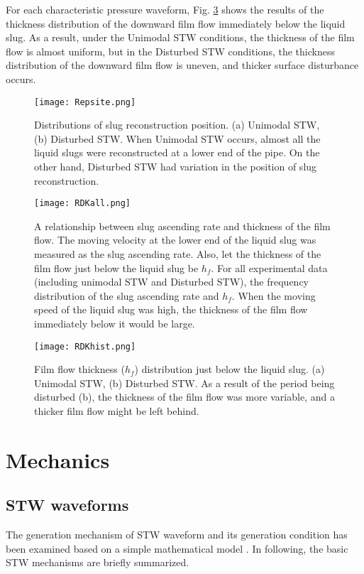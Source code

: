 \documentclass[aps,pre,preprint,groupedaddress,showkeys]{revtex4-2}
\begin{document}
For each characteristic pressure waveform, Fig. \ref{RDKhist} shows the results of the thickness distribution of the downward film flow immediately below the liquid slug.
As a result, under the Unimodal STW conditions, the thickness of the film flow is almost uniform, but in the Disturbed STW conditions, the thickness distribution of the downward film flow is uneven, and thicker surface disturbance occurs.

\begin{figure}
\texttt{[image: Repsite.png]} 
\caption{\label{Repsite}Distributions of slug reconstruction position. (a) Unimodal STW, (b) Disturbed STW. When Unimodal STW occurs, almost all the liquid slugs were reconstructed at a lower end of the pipe.
On the other hand, Disturbed STW had variation in the position of slug reconstruction.}
\end{figure} 

\begin{figure}
\texttt{[image: RDKall.png]} 
\caption{\label{RDKall}A relationship between slug ascending rate and thickness of the film flow.
The moving velocity at the lower end of the liquid slug was measured as the slug ascending rate.
Also, let the thickness of the film flow just below the liquid slug be $ h_f $.
For all experimental data (including unimodal STW and Disturbed STW), the frequency distribution of the slug ascending rate and $ h_f $.
When the moving speed of the liquid slug was high, the thickness of the film flow immediately below it would be large.}
\end{figure} 


\begin{figure}
\texttt{[image: RDKhist.png]} 
\caption{\label{RDKhist}Film flow thickness ($ h_f $) distribution just below the liquid slug.
(a) Unimodal STW, (b) Disturbed STW.
As a result of the period being disturbed (b), the thickness of the film flow was more variable, and a thicker film flow might be left behind.}
\end{figure} 

\section{Mechanics}\label{mec}
\subsection{STW waveforms}
The generation mechanism of STW waveform and its generation condition has been examined based on a simple mathematical model \citep{kanno2018}.
In following, the basic STW mechanisms are briefly summarized.
\end{document}
